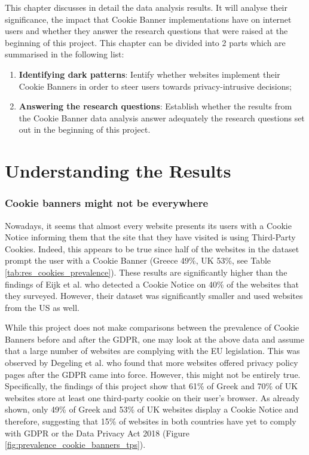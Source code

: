 \documentclass[../main.tex]{subfiles}
\begin{document}
This chapter discusses in detail the data analysis results. It will analyse their significance, the impact that Cookie Banner implementations have on internet users and whether they answer the research questions that were raised at the beginning of this project. This chapter can be divided into 2 parts which are summarised in the following list: 

\begin{enumerate}
    \item \textbf{Identifying dark patterns}: Ientify whether websites implement their Cookie Banners in order to steer users towards privacy-intrusive decisions; 
    \item \textbf{Answering the research questions}: Establish whether the results from the Cookie Banner data analysis answer adequately the research questions set out in the beginning of this project.
\end{enumerate}

\section{Understanding the Results}

\subsubsection{Cookie banners might not be everywhere}
Nowadays, it seems that almost every website presents its users with a Cookie Notice informing them that the site that they have visited is using Third-Party Cookies. Indeed, this appears to be true since half of the websites in the dataset prompt the user with a Cookie Banner (Greece 49\%, UK 53\%, see Table \ref{tab:res_cookies_prevalence}). These results are significantly higher than the findings of Eijk et al. \cite{eijk2019impact} who detected a Cookie Notice on 40\% of the websites that they surveyed. However, their dataset was significantly smaller and used websites from the US as well.

While this project does not make comparisons between the prevalence of Cookie Banners before and after the GDPR, one may look at the above data and assume that a large number of websites are complying with the EU legislation. This was observed by Degeling et al. \cite{degeling2018we} who found that more websites offered privacy policy pages after the GDPR came into force. However, this might not be entirely true. Specifically, the findings of this project show that 61\% of Greek and 70\% of UK websites store at least one third-party cookie on their user’s browser. As already shown, only 49\% of Greek and 53\% of UK websites display a Cookie Notice and therefore, suggesting that 15\% of websites in both countries have yet to comply with GDPR or the Data Privacy Act 2018 (Figure \ref{fig:prevalence_cookie_banners_tps}).
\end{document}
